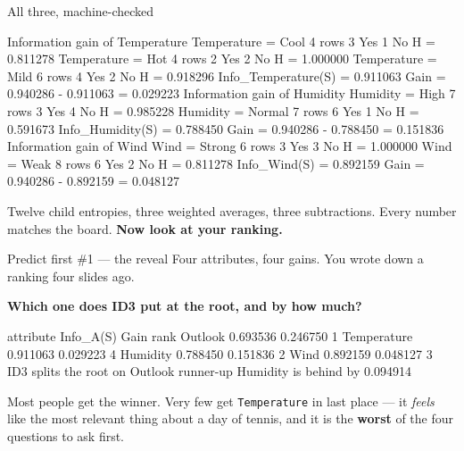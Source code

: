 \documentclass[aspectratio=169]{beamer}
\begin{document}
\begin{frame}[fragile,shrink=10]{All three, machine-checked}
\begin{outblk}
Information gain of Temperature
   Temperature = Cool     4 rows  3 Yes 1 No   H = 0.811278
   Temperature = Hot      4 rows  2 Yes 2 No   H = 1.000000
   Temperature = Mild     6 rows  4 Yes 2 No   H = 0.918296
   Info_Temperature(S) = 0.911063     Gain = 0.940286 - 0.911063 = 0.029223
Information gain of Humidity
   Humidity    = High     7 rows  3 Yes 4 No   H = 0.985228
   Humidity    = Normal   7 rows  6 Yes 1 No   H = 0.591673
   Info_Humidity(S) = 0.788450     Gain = 0.940286 - 0.788450 = 0.151836
Information gain of Wind
   Wind        = Strong   6 rows  3 Yes 3 No   H = 1.000000
   Wind        = Weak     8 rows  6 Yes 2 No   H = 0.811278
   Info_Wind(S) = 0.892159     Gain = 0.940286 - 0.892159 = 0.048127
\end{outblk}
\begin{center}\small
  Twelve child entropies, three weighted averages, three subtractions. Every
  number matches the board. \textbf{Now look at your ranking.}
\end{center}
\end{frame}

\begin{frame}[fragile,shrink=6]{Predict first \#1 --- the reveal}
Four attributes, four gains. You wrote down a ranking four slides ago.
\begin{center}
  \textbf{Which one does ID3 put at the root, and by how much?}
\end{center}
\vspace{0.2em}
\begin{outblk}
attribute      Info_A(S)     Gain     rank
Outlook        0.693536   0.246750   1
Temperature    0.911063   0.029223   4
Humidity       0.788450   0.151836   2
Wind           0.892159   0.048127   3
ID3 splits the root on Outlook
runner-up Humidity is behind by 0.094914
\end{outblk}
\begin{center}\small
  Most people get the winner. Very few get \texttt{Temperature} in last place
  --- it \emph{feels} like the most relevant thing about a day of tennis, and
  it is the \textbf{worst} of the four questions to ask first.
\end{center}
\end{frame}
\end{document}
